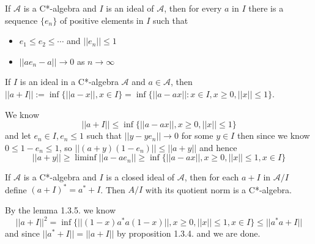 \begin{proposition}
    If $\mathcal{A}$ is a C*-algebra and $I$ is an ideal of $\mathcal{A}$, then for every $a$ in $I$ there is a sequence $\{e_n\}$ of positive elements in $I$ such that
    \begin{itemize}
        \item $e_1\leq e_2\leq \cdots$ and $||e_n|| \leq 1$
        \item $||ae_n - a|| \to 0$ as $n\to \infty$
    \end{itemize}
\end{proposition} 

\begin{lemma}
    If $I$ is an ideal in a C*-algebra $\mathcal{A}$ and $a\in\mathcal{A}$, then $||a+I||:= \inf\{||a-x||,x\in I\} = \inf\{||a-ax||:x\in I, x\geq 0, ||x||\leq 1\}$.
\end{lemma}
\Pf\par
    We know
    \[||a+I|| \leq \inf\{||a-ax||, x\geq 0, ||x|| \leq 1\}\]
    and let $e_n\in I, e_n\leq 1$ such that $||y-ye_n|| \to 0$ for some $y\in I$ then since we know $0\leq 1- e_n \leq 1$, so $||(a+y)(1-e_n)|| \leq ||a+y||$ and hence
    \[
    ||a+y|| \geq \liminf ||a-ae_n|| \geq \inf\{||a-ax||, x\geq 0, ||x|| \leq 1, x\in I\}
    \]


\begin{theorem}
    If $\mathcal{A}$ is a C*-algebra and $I$ is a closed ideal of $\mathcal{A}$, then for each $a+I$ in $\mathcal{A}/I$ define $(a+I)^* = a^*+I$. Then $A/I$ with its quotient norm is a C*-algebra.
\end{theorem}
\Pf\par
    By the lemma 1.3.5. we know
    \[||a+I||^2 = \inf\{||(1-x)a^*a(1-x)||, x\geq 0, ||x||\leq 1, x\in I\}\leq ||a^*a+I||\]
    and since $||a^*+I|| = ||a+I||$ by proposition 1.3.4. and we are done.
    
